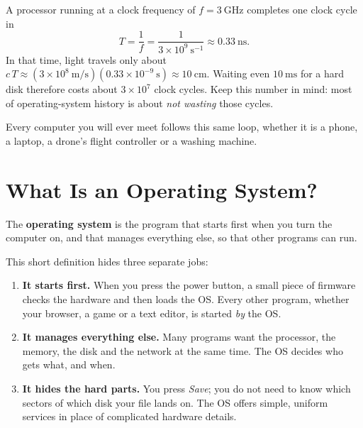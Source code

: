 \documentclass[11pt,a4paper]{article}
\begin{document}
\begin{example}
A processor running at a clock frequency of $f = 3\ \text{GHz}$ completes one clock cycle in
\[
T = \frac{1}{f} = \frac{1}{3\times 10^{9}\ \text{s}^{-1}} \approx 0.33\ \text{ns}.
\]
In that time, light travels only about $c\,T \approx (3\times10^{8}\ \text{m/s})(0.33\times10^{-9}\ \text{s}) \approx 10\ \text{cm}$. Waiting even $10\ \text{ms}$ for a hard disk therefore costs about $3\times10^{7}$ clock cycles. Keep this number in mind: most of operating-system history is about \emph{not wasting} those cycles.
\end{example}

Every computer you will ever meet follows this same loop, whether it is a phone, a laptop, a drone's flight controller or a washing machine.

\section{What Is an Operating System?}

\begin{keyidea}
The \textbf{operating system} is the program that starts first when you turn the computer on, and that manages everything else, so that other programs can run.
\end{keyidea}

This short definition hides three separate jobs:

\begin{enumerate}[leftmargin=1.4em]
  \item \textbf{It starts first.} When you press the power button, a small piece of firmware checks the hardware and then loads the OS. Every other program, whether your browser, a game or a text editor, is started \emph{by} the OS.
  \item \textbf{It manages everything else.} Many programs want the processor, the memory, the disk and the network at the same time. The OS decides who gets what, and when.
  \item \textbf{It hides the hard parts.} You press \emph{Save}; you do not need to know which sectors of which disk your file lands on. The OS offers simple, uniform services in place of complicated hardware details.
\end{enumerate}
\end{document}
